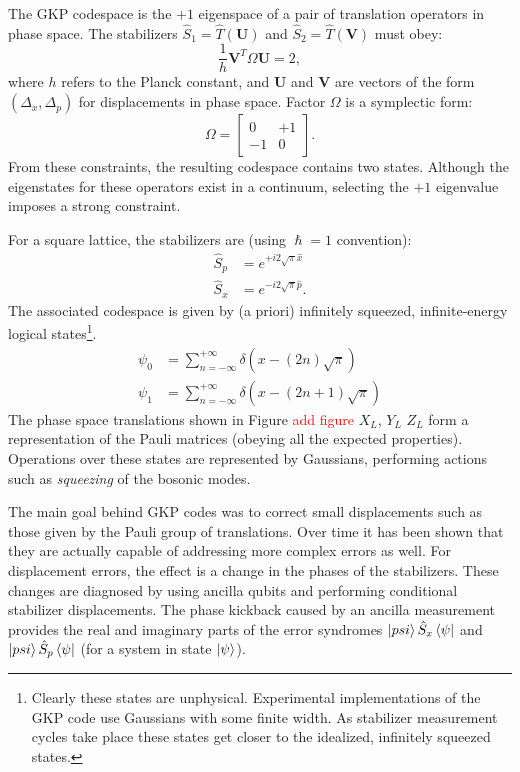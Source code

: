 The GKP codespace is the $+1$ eigenspace of a pair of translation operators in phase space. The stabilizers $\hat{S}_1=\hat{T}(\mathbf{U})$ and $\hat{S}_2=\hat{T}(\mathbf{V})$ must obey:
\begin{equation}
    \frac{1}{h}\mathbf{V}^T\Omega\mathbf{U}=2,
\end{equation}
where $h$ refers to the Planck constant, and $\mathbf{U}$ and $\mathbf{V}$ are vectors of the form $(\Delta_x,\Delta_p)$ for displacements in phase space. Factor $\Omega$ is a symplectic form:
\begin{equation}
    \Omega=\begin{bmatrix}
        0 &+1\\
        -1& 0
    \end{bmatrix}.
\end{equation}
From these constraints, the resulting codespace contains two states. Although the eigenstates for these operators exist in a continuum, selecting the $+1$ eigenvalue imposes a strong constraint.

For a square lattice, the stabilizers are (using $\hslash=1$ convention):
\begin{eqnarray}
    \hat{S}_p&=e^{+i2\sqrt{\pi}\hat{x}}\\
    \hat{S}_x&=e^{-i2\sqrt{\pi}\hat{p}}.
\end{eqnarray}
The associated codespace is given by (a priori) infinitely squeezed, infinite-energy logical states\footnote{Clearly these states are unphysical. Experimental implementations of the GKP code use Gaussians with some finite width. As stabilizer measurement cycles take place these states get closer to the idealized, infinitely squeezed states.}.
\begin{eqnarray}
    \psi_0&=\sum_{n=-\infty}^{+\infty} \delta(x-(2n)\sqrt{\pi})\\
    \psi_1&=\sum_{n=-\infty}^{+\infty} \delta(x-(2n+1)\sqrt{\pi})
\end{eqnarray}
The phase space translations shown in Figure \textcolor{red}{add figure} $X_L$, $Y_L$ $Z_L$ form a representation of the Pauli matrices (obeying all the expected properties). Operations over these states are represented by Gaussians, performing actions such as \textit{squeezing} of the bosonic modes.

The main goal behind GKP codes was to correct small displacements such as those given by the Pauli group of translations. Over time it has been shown that they are actually capable of addressing more complex errors as well.
For displacement errors, the effect is a change in the phases of the stabilizers. These changes are diagnosed by using ancilla qubits and performing conditional stabilizer displacements. The phase kickback caused by an ancilla measurement provides the real and imaginary parts of the error syndromes $\ket{psi}\hat{S}_x\bra{\psi}$ and $\ket{psi}\hat{S}_p\bra{\psi}$ (for a system in state $\ket{\psi}$).

